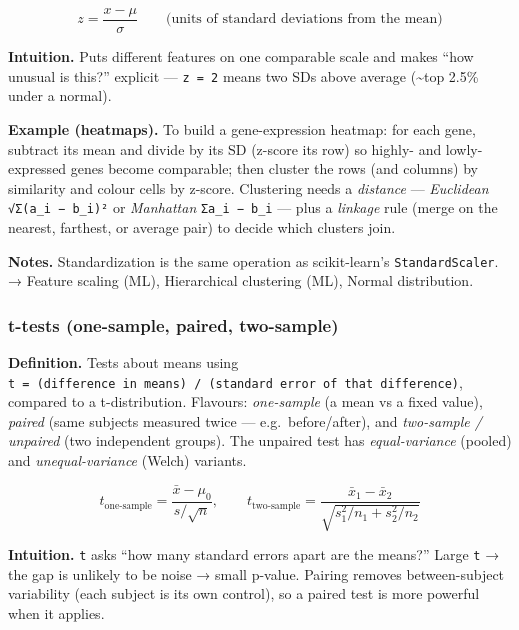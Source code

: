 \documentclass[
  10pt,
  letterpaper,
  onecolumn]{article}
\begin{document}
\begin{equation*}
z=\frac{x-\mu}{\sigma}
\qquad\text{(units of standard deviations from the mean)}
\end{equation*}

\textbf{Intuition.} Puts different features on one comparable scale and
makes ``how unusual is this?'' explicit --- \texttt{z\ =\ 2} means two
SDs above average (\textasciitilde top 2.5\% under a normal).

\textbf{Example (heatmaps).} To build a gene-expression heatmap: for
each gene, subtract its mean and divide by its SD (z-score its row) so
highly- and lowly-expressed genes become comparable; then cluster the
rows (and columns) by similarity and colour cells by z-score. Clustering
needs a \emph{distance} --- \emph{Euclidean} \texttt{√Σ(a\_i\ −\ b\_i)²}
or \emph{Manhattan} \texttt{Σ\textbar{}a\_i\ −\ b\_i\textbar{}} --- plus
a \emph{linkage} rule (merge on the nearest, farthest, or average pair)
to decide which clusters join.

\textbf{Notes.} Standardization is the same operation as scikit-learn's
\texttt{StandardScaler}. → Feature scaling (ML), Hierarchical clustering
(ML), Normal distribution.

\hypertarget{t-tests-one-sample-paired-two-sample}{%
\subsubsection{t-tests (one-sample, paired,
two-sample)}\label{t-tests-one-sample-paired-two-sample}}

\textbf{Definition.} Tests about means using
\texttt{t\ =\ (difference\ in\ means)\ /\ (standard\ error\ of\ that\ difference)},
compared to a t-distribution. Flavours: \emph{one-sample} (a mean vs a
fixed value), \emph{paired} (same subjects measured twice ---
e.g.~before/after), and \emph{two-sample / unpaired} (two independent
groups). The unpaired test has \emph{equal-variance} (pooled) and
\emph{unequal-variance} (Welch) variants.

\begin{equation*}
t_{\text{one-sample}}=\frac{\bar x-\mu_0}{s/\sqrt{n}},
\qquad
t_{\text{two-sample}}=\frac{\bar x_1-\bar x_2}{\sqrt{s_1^2/n_1+s_2^2/n_2}}
\end{equation*}

\textbf{Intuition.} \texttt{t} asks ``how many standard errors apart are
the means?'' Large \texttt{\textbar{}t\textbar{}} → the gap is unlikely
to be noise → small p-value. Pairing removes between-subject variability
(each subject is its own control), so a paired test is more powerful
when it applies.
\end{document}
